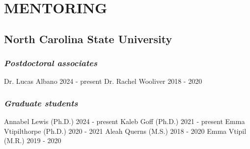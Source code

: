 \documentclass[11pt,english]{article}
\begin{document}
\section*{MENTORING}


\subsection*{North Carolina State University}

\subsubsection*{\emph{Postdoctoral associates}}
Dr. Lucas Albano \hfill {2024 - present}  \newline
Dr. Rachel Wooliver \hfill {2018 - 2020}

\subsubsection*{\emph{Graduate students}}
Annabel Lewis (Ph.D.) \hfill {2024 - present} \newline
Kaleb Goff (Ph.D.) \hfill {2021 - present} \newline
Emma Vtipilthorpe (Ph.D.) \hfill {2020 - 2021} \newline
Aleah Querns (M.S.) \hfill {2018 - 2020} \newline
Emma Vtipil (M.R.) \hfill {2019 - 2020}
\end{document}

